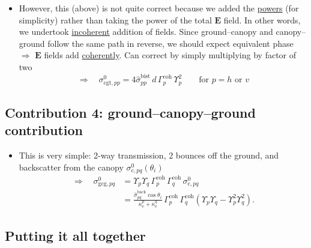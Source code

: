 \documentclass[11pt, oneside]{article}
\newcommand{\ke}[1]{\kappa_\mathrm{e}^{#1}}
\newcommand{\sback}{\hat{\sigma}^\mathrm{back}_{pq}}
\newcommand{\Gc}[1]{\Gamma_{#1}^\mathrm{coh}}
\begin{document}
\begin{itemize}
	\item However, this (above) is not quite correct because we added the \underline{powers} (for simplicity) rather than taking the power of the total $\mathbf{E}$ field. In other words, we undertook \underline{incoherent} addition of fields. Since ground--canopy and canopy--ground follow the same path in reverse, we should expect equivalent phase $\Rightarrow$ $\mathbf{E}$ fields add \underline{coherently}. Can correct by simply multiplying by factor of two
	\begin{equation}
		\label{e:scgt_coh}
		\Rightarrow\quad \boxed{\sigma^0_{\mathrm{cgt},pp} = 4\hat{\sigma}^\mathrm{bist}_{pp}\,d\,\Gc{p}\,\Upsilon_p^2 \qquad \text{for } p = h \text{ or } v}
	\end{equation}
\end{itemize}

\subsection{Contribution 4: ground--canopy--ground contribution}

\begin{itemize}
	\item This is very simple: 2-way transmission, 2 bounces off the ground, and backscatter from the canopy $\sigma^0_{\mathrm{c},pq}(\theta_i)$
	\begin{align}
		\Rightarrow\quad \sigma^0_{\mathrm{gcg},pq} &= \Upsilon_p\Upsilon_q\,\Gc{p}\,\Gc{q}\,\sigma^0_{\mathrm{c},pq} \nonumber\\
		&= \frac{\sback\cos\theta_i}{\ke{p}+\ke{q}}\,\Gc{p}\,\Gc{q}\left(\Upsilon_p\Upsilon_q - \Upsilon_p^2\Upsilon_q^2\right). \label{e:sgcg}
	\end{align}
\end{itemize}

\subsection{Putting it all together}
\label{s:total}
\end{document}
